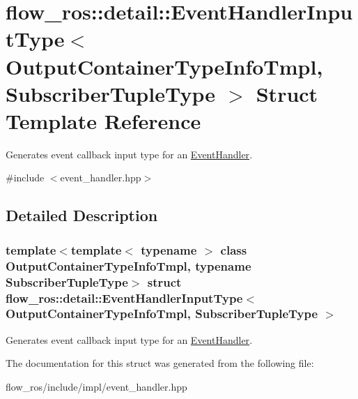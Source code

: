\hypertarget{structflow__ros_1_1detail_1_1_event_handler_input_type}{}\section{flow\+\_\+ros\+:\+:detail\+:\+:Event\+Handler\+Input\+Type$<$ Output\+Container\+Type\+Info\+Tmpl, Subscriber\+Tuple\+Type $>$ Struct Template Reference}
\label{structflow__ros_1_1detail_1_1_event_handler_input_type}


Generates event callback input type for an \hyperlink{classflow__ros_1_1_event_handler}{Event\+Handler}.  




{\ttfamily \#include $<$event\+\_\+handler.\+hpp$>$}



\subsection{Detailed Description}
\subsubsection*{template$<$template$<$ typename $>$ class Output\+Container\+Type\+Info\+Tmpl, typename Subscriber\+Tuple\+Type$>$\newline
struct flow\+\_\+ros\+::detail\+::\+Event\+Handler\+Input\+Type$<$ Output\+Container\+Type\+Info\+Tmpl, Subscriber\+Tuple\+Type $>$}

Generates event callback input type for an \hyperlink{classflow__ros_1_1_event_handler}{Event\+Handler}. 

The documentation for this struct was generated from the following file\+:\begin{DoxyCompactItemize}
\item 
flow\+\_\+ros/include/impl/event\+\_\+handler.\+hpp\end{DoxyCompactItemize}
